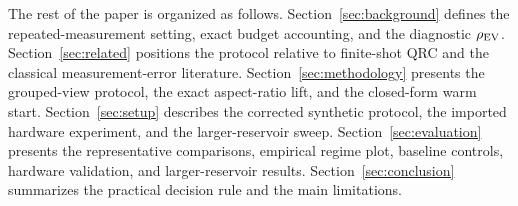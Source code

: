 The rest of the paper is organized as follows. Section~\ref{sec:background} defines the repeated-measurement setting, exact budget accounting, and the diagnostic $\rho_{\mathrm{EV}}$. Section~\ref{sec:related} positions the protocol relative to finite-shot QRC and the classical measurement-error literature. Section~\ref{sec:methodology} presents the grouped-view protocol, the exact aspect-ratio lift, and the closed-form warm start. Section~\ref{sec:setup} describes the corrected synthetic protocol, the imported hardware experiment, and the larger-reservoir sweep. Section~\ref{sec:evaluation} presents the representative comparisons, empirical regime plot, baseline controls, hardware validation, and larger-reservoir results. Section~\ref{sec:conclusion} summarizes the practical decision rule and the main limitations.
